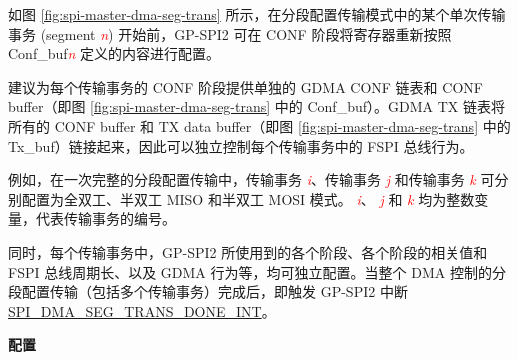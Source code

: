 \documentclass[main\_\_CN.tex]{subfiles}
\begin{document}
如图 \ref{fig:spi-master-dma-seg-trans} 所示，在分段配置传输模式中的某个单次传输事务 (segment \textcolor{red}{\it{n}}) 开始前，GP-SPI2 可在 CONF 阶段将寄存器重新按照 Conf\_buf\textcolor{red}{\it{n}}  定义的内容进行配置。

建议为每个传输事务的 CONF 阶段提供单独的 GDMA CONF 链表和 CONF buffer（即图 \ref{fig:spi-master-dma-seg-trans} 中的 Conf\_buf）。GDMA TX 链表将所有的 CONF buffer 和 TX data buffer（即图 \ref{fig:spi-master-dma-seg-trans} 中的 Tx\_buf）链接起来，因此可以独立控制每个传输事务中的 FSPI 总线行为。

例如，在一次完整的分段配置传输中，传输事务 \textcolor{red}{\it i}、传输事务 \textcolor{red}{\it j} 和传输事务 \textcolor{red}{\it k} 可分别配置为全双工、半双工 MISO 和半双工 MOSI 模式。 \textcolor{red}{\it i}、 \textcolor{red}{\it j} 和  \textcolor{red}{\it k} 均为整数变量，代表传输事务的编号。

同时，每个传输事务中，GP-SPI2 所使用到的各个阶段、各个阶段的相关值和 FSPI 总线周期长、以及 GDMA 行为等，均可独立配置。当整个 DMA 控制的分段配置传输（包括多个传输事务）完成后，即触发 GP-SPI2 中断 \hyperref[int:SPIDMASEGTRANSDONEINT]{SPI\_DMA\_SEG\_TRANS\_DONE\_INT}。

\textbf{配置}
\end{document}
